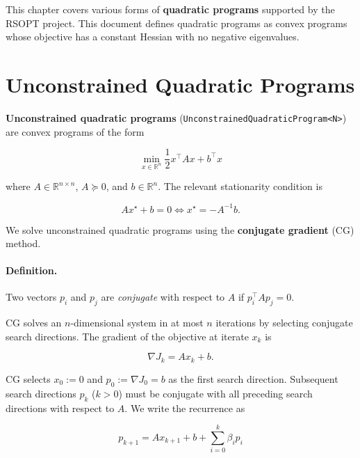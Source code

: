 \documentclass[12pt,titlepage]{report}
\begin{document}
	This chapter covers various forms of \textbf{quadratic programs} supported by the RSOPT project.  This document defines quadratic programs as convex programs whose objective has a constant Hessian with no negative eigenvalues.
	
	\section{Unconstrained Quadratic Programs}
	
	\textbf{Unconstrained quadratic programs} (\texttt{UnconstrainedQuadraticProgram<N>}) are convex programs of the form
	
	\begin{equation}
		\min_{x \in \mathbb{R}^n} \frac12 x^\top A x + b^\top x
	\end{equation}
	
	where \( A \in \mathbb{R}^{n \times n} \), \( A \succeq 0 \), and \( b \in \mathbb{R}^n \).  The relevant stationarity condition is
	
	\begin{equation}
		Ax^\star + b = 0 \Leftrightarrow x^\star = -A^{-1} b.
	\end{equation}
	
	We solve unconstrained quadratic programs using the \textbf{conjugate gradient} (CG) method.
	
	\paragraph{Definition.} Two vectors \( p_i \) and \( p_j \) are \textit{conjugate} with respect to \( A \) if \( p_i^\top A p_j = 0 \).
	\vspace{0.4cm}
	
	CG solves an \( n \)-dimensional system in at most \( n \) iterations by selecting conjugate search directions.  The gradient of the objective at iterate \( x_k \) is
	
	\begin{equation}
		\nabla J_k = A x_k + b .
	\end{equation}
	
	CG selects \( x_0 := 0 \) and \( p_0 := \nabla J_0 = b \) as the first search direction.  Subsequent search directions \( p_k \) (\( k > 0 \)) must be conjugate with all preceding search directions with respect to \( A \).  We write the recurrence as
	
	\begin{equation}
		p_{k+1} = A x_{k+1} + b + \sum_{i=0}^k \beta_i p_i
	\end{equation}
	
\end{document}
